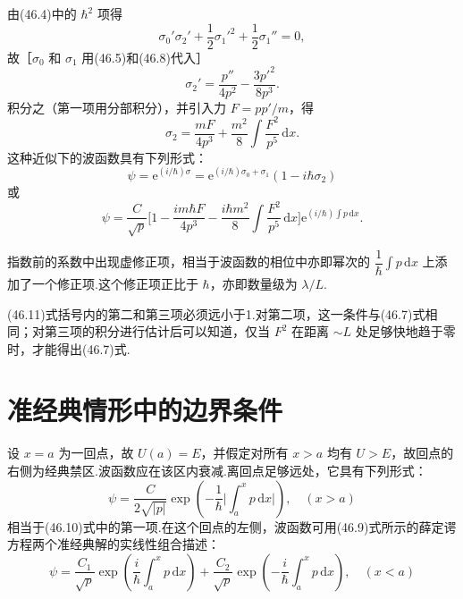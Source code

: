 由(46.4)中的 $\hbar^2$ 项得
\begin{equation*}
  {\sigma_0'}{\sigma_2'}+\frac{1}{2}{\sigma_1'}^2+\frac{1}{2}\sigma_1''=0,
\end{equation*}
故［$\sigma_0$ 和 $\sigma_1$ 用(46.5)和(46.8)代入］
\begin{equation*}
  \sigma_2'=\frac{p''}{4p^2}-\frac{3{p'}^2}{8p^3}.
\end{equation*}
积分之（第一项用分部积分），并引入力 $F=pp'/m$，得
\begin{equation*}
  \sigma_2=\frac{mF}{4p^3}+\frac{m^2}{8}\int\frac{F^2}{p^5}\,\mathrm{d}x.
\end{equation*}
这种近似下的波函数具有下列形式：
\begin{equation*}
  \psi=\mathrm{e}^{(i/\hbar)\sigma}
  =\mathrm{e}^{(i/\hbar)\sigma_0+\sigma_1}\left(1-i\hbar\sigma_2\right)
\end{equation*}
或
\begin{equation}
  \psi=\frac{C}{\sqrt{p}}\bigg[1-\frac{im\hbar F}{4p^3}
  -\frac{i\hbar m^2}{8}\int\frac{F^2}{p^5}\,\mathrm{d}x\bigg]
  \mathrm{e}^{(i/\hbar)\int p\,\mathrm{d}x}.
\end{equation}

指数前的系数中出现虚修正项，相当于波函数的相位中亦即幂次的 $\dfrac{1}{\hbar}\int p\,\mathrm{d}x$ 上添加了一个修正项.这个修正项正比于 $\hbar$，亦即数量级为 $\lambda/L$.

(46.11)式括号内的第二和第三项必须远小于1.对第二项，这一条件与(46.7)式相同；对第三项的积分进行估计后可以知道，仅当 $F^2$ 在距离 $\sim L$ 处足够快地趋于零时，才能得出(46.7)式.

\section{准经典情形中的边界条件}

设 $x=a$ 为一回点，故 $U(a)=E$，并假定对所有 $x>a$ 均有 $U>E$，故回点的右侧为经典禁区.波函数应在该区内衰减.离回点足够远处，它具有下列形式：
\begin{equation}
  \psi=\frac{C}{2\sqrt{|p|}}\exp\left(-\frac{1}{\hbar}
  \bigg|\int_a^x p\,\mathrm{d}x\bigg|\right),\quad(x>a)
\end{equation}
相当于(46.10)式中的第一项.在这个回点的左侧，波函数可用(46.9)式所示的薛定谔方程两个准经典解的实线性组合描述：
\begin{equation}
  \psi=\frac{C_1}{\sqrt{p}}\exp\left(\frac{i}{\hbar}\int_a^x p\,\mathrm{d}x\right)
  +\frac{C_2}{\sqrt{p}}\exp\left(-\frac{i}{\hbar}\int_a^x p\,\mathrm{d}x\right),
  \quad(x<a)
\end{equation}

